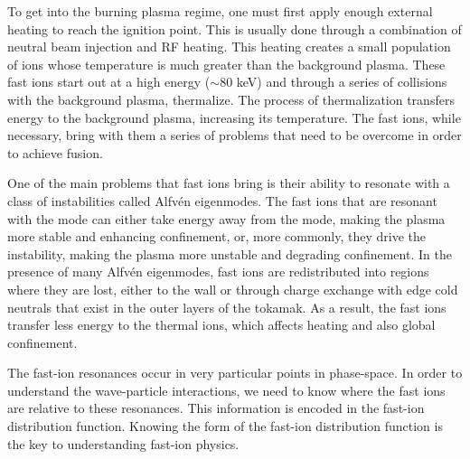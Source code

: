 To get into the burning plasma regime, one must first apply enough external heating to reach the ignition point. This is usually done through a combination of neutral beam injection and RF heating. This heating creates a small population of ions whose temperature is much greater than the background plasma. These fast ions start out at a high energy ($\sim 80$ keV) and through a series of collisions with the background plasma, thermalize. The process of thermalization transfers energy to the background plasma, increasing its temperature. The fast ions, while necessary, bring with them a series of problems that need to be overcome in order to achieve fusion.

One of the main problems that fast ions bring is their ability to resonate with a class of instabilities called Alfv\'en eigenmodes\cite{heidbrink2008basic}. The fast ions that are resonant with the mode can either take energy away from the mode, making the plasma more stable and enhancing confinement, or, more commonly, they drive the instability, making the plasma more unstable and degrading confinement. In the presence of many Alfv\'en eigenmodes, fast ions are redistributed into regions where they are lost, either to the wall or through charge exchange with edge cold neutrals that exist in the outer layers of the tokamak. As a result, the fast ions transfer less energy to the thermal ions, which affects heating and also global confinement.\cite{heidbrink2014confinement,holcomb2015fast}

The fast-ion resonances occur in very particular points in phase-space. In order to understand the wave-particle interactions, we need to know where the fast ions are relative to these resonances. This information is encoded in the fast-ion distribution function. Knowing the form of the fast-ion distribution function is the key to understanding fast-ion physics.

